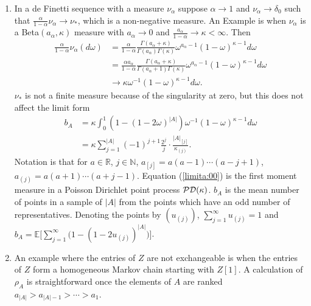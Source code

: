 \documentclass[preprint,11pt]{elsarticle}
\theoremstyle{remark}
\begin{document}
{\begin{enumerate}[label=(\alph*)]
\item \label{item:05} In a de Finetti sequence with a measure $\nu_\alpha$  suppose $\alpha \to 1$ and $\nu_\alpha \to \delta_0$ such that $\frac{\alpha}{1-\alpha}\nu_\alpha \to \nu_*$, which is a non-negative measure.
An Example is when $\nu_\alpha$ is a Beta$(a_\alpha,\kappa)$ measure with $a_\alpha \to 0$ and
$\frac{a_\alpha}{1-\alpha}\to \kappa < \infty$. Then
\begin{align}
\frac{\alpha}{1-\alpha}\nu_\alpha(d\omega) &= 
\frac{\alpha}{1-\alpha}\frac{\Gamma(a_\alpha+\kappa)}{\Gamma(a_\alpha)\Gamma(\kappa)}
\omega^{a_\alpha-1}(1-\omega)^{\kappa-1}d\omega\nonumber \\
&= \frac{\alpha a_\alpha}{1-\alpha}\frac{\Gamma(a_\alpha+\kappa)}{\Gamma(a_\alpha+1)\Gamma(\kappa)}
\omega^{a_\alpha-1}(1-\omega)^{\kappa-1}d\omega\nonumber \\
& \to \kappa \omega^{-1}(1-\omega)^{\kappa-1}d\omega.
\label{limita:00}
\end{align}
$\nu_*$ is not a finite measure because of the singularity at zero, but this does not affect
the limit form
\begin{align}
b_A &= \kappa\int_0^1(1-(1-2\omega)^{|A|})\omega^{-1}(1-\omega)^{\kappa -1}d\omega\nonumber\\
&= \kappa\sum_{j=1}^{|A|}(-1)^{j+1}\frac{2^j}{j}\cdot \frac{|A|_{[j]}}{\kappa_{(j)}}.
\nonumber
\end{align}
Notation is that for $a\in \mathbb{R}$, $j \in \mathbb{N}$, 
$a_{[j]} = a(a-1)\cdots (a-j+1)$, $a_{(j)} = a(a+1)\cdots (a+j-1)$.
Equation (\ref{limita:00}) is the first moment measure in a Poisson Dirichlet point process ${\cal PD}(\kappa)$. $b_A$ is the mean number of points in a sample of $|A|$ from the points which have an odd number of representatives. Denoting the points by $(u_{(j)})$,
$\sum_{j=1}^\infty u_{(j)} = 1$ and
 $b_A = \mathbb{E}\Big [\sum_{j=1}^\infty \Big ( 1 - (1-2u_{(j)})^{|A|}\big )\Big ]$.
 \item \label{item:06}
 An example where the entries of $Z$ are not exchangeable is when the entries of $Z$ form a homogeneous Markov chain starting with $Z[1]$. 
A calculation of $\rho_A$ is straightforward once the elements of $A$ are ranked $a_{|A|} > a_{|A|-1} > \cdots > a_1$.
\end{enumerate}
%
}
\end{document}
